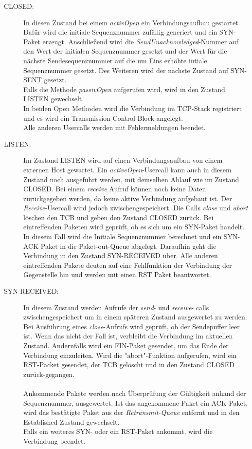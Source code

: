 \begin{description}
\item[CLOSED:]
In diesen Zustand bei einem \textit{activOpen} ein Verbindungsaufbau gestartet. Dafür wird die initiale Sequenznummer zufällig generiert und ein SYN-Paket erzeugt. Anschließend wird die \textit{SendUnacknowledged}-Nummer auf den Wert der initialen Sequenznummer gesetzt und der Wert für die nächste Sendesequenznummer auf die um Eins erhöhte intiale Sequenznummer gesetzt. Des Weiteren wird der nächste Zustand auf SYN-SENT gesetzt. \\
Falls die Methode \textit{passivOpen} aufgerufen wird, wird in den Zustand LISTEN gewechselt. \\
In beiden Open Methoden wird die Verbindung im TCP-Stack registriert und es wird ein Transmission-Control-Block angelegt.\\
Alle anderen Usercalls werden mit Fehlermeldungen beendet. 

\item[LISTEN:]
Im Zustand LISTEN wird auf einen Verbindungsaufbau von einem externen Host gewartet. Ein \textit{activeOpen}-Usercall kann auch in diesem Zustand noch ausgeführt werden, mit demselben Ablauf wie im Zustand CLOSED. Bei einem \textit{receive} Aufruf können noch keine Daten zurückgegeben werden, da keine aktive Verbindung aufgebaut ist. Der \textit{Receive}-Usercall wird jedoch zwischengespeichert. 
Die Calls \textit{close} und \textit{abort} löschen den TCB und geben den Zustand CLOSED zurück.
Bei eintreffenden Paketen wird geprüft, ob es sich um ein SYN-Paket handelt. In diesem Fall wird die Initiale Sequenznummer berechnet und ein SYN-ACK Paket in die Paket-out-Queue abgelegt. Daraufhin geht die Verbindung in den Zustand SYN-RECEIVED über. Alle anderen eintreffenden Pakete deuten auf eine Fehlfunktion der Verbindung der Gegenstelle hin und werden mit einen RST Paket beantwortet. 


\item[SYN-RECEIVED:]
In diesem Zustand werden Aufrufe der \textit{send}- und \textit{receive}- calls zwischengespeichert um in einem späteren Zustand ausgewertet zu werden. 
Bei Ausführung eines \textit{close}-Aufrufs wird geprüft, ob der Sendepuffer leer ist. Wenn das nicht der Fall ist, verbleibt die Verbindung im aktuellen Zustand. Andernfalls wird ein FIN-Paket gesendet, um das Ende der Verbindung einzuleiten. 
Wird die "{}abort"{}-Funktion aufgerufen, wird ein RST-Packet gesendet, der TCB gelöscht und in den Zustand CLOSED zurück-gegangen.\\\\
Ankommende Pakete werden nach Überprüfung der Gültigkeit anhand der Sequenznummer, ausgewertet. Ist das angekommene Paket ein ACK-Paket, wird das bestätigte Paket aus der \textit{Retransmit-Queue} entfernt und in den Established Zustand gewechselt. \\ Falls ein weiteres SYN- oder ein RST-Paket ankommt, wird die Verbindung beendet. 


\end{description}
